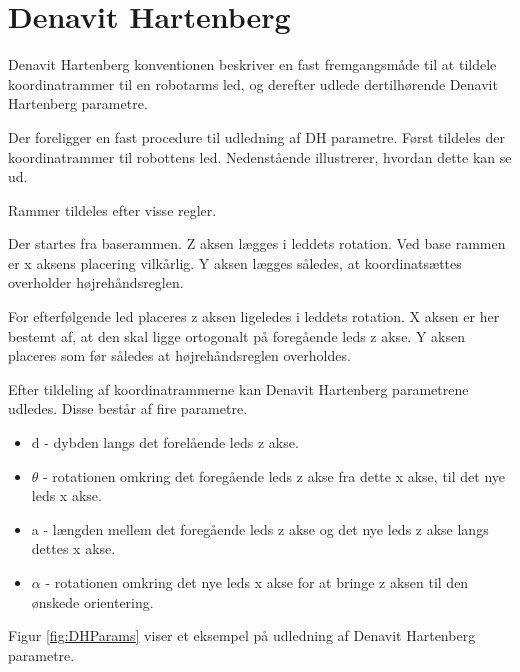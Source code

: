 \chapter{Denavit Hartenberg}\label{app:DenavitHartenberg}

Denavit Hartenberg konventionen beskriver en fast fremgangsmåde til at tildele koordinatrammer til en robotarms led, og derefter udlede dertilhørende Denavit Hartenberg parametre.

Der foreligger en fast procedure til udledning af DH parametre. 
Først tildeles der koordinatrammer til robottens led. Nedenstående illustrerer, hvordan dette kan se ud.


Rammer tildeles efter visse regler. 

Der startes fra baserammen. Z aksen lægges i leddets rotation. Ved base rammen er x aksens placering vilkårlig. Y aksen lægges således, at koordinatsættes overholder højrehåndsreglen. 
	
For efterfølgende led placeres z aksen ligeledes i leddets rotation. X aksen er her bestemt af, at den skal ligge ortogonalt på foregående leds z akse. Y aksen placeres som før således at højrehåndsreglen overholdes.

Efter tildeling af koordinatrammerne kan Denavit Hartenberg parametrene udledes. Disse består af fire parametre.
	 
\begin{itemize}
\item d - dybden langs det forelående leds z akse.
\item $\theta$ - rotationen omkring det foregående leds z akse fra dette x akse, til det nye leds x akse. 
\item a - længden mellem det foregående leds z akse og det nye leds z akse langs dettes x akse.
\item $\alpha$ - rotationen omkring det nye leds x akse for at bringe z aksen til den ønskede orientering.
\end{itemize}

Figur \ref{fig:DHParams} viser et eksempel på udledning af Denavit Hartenberg parametre. 








